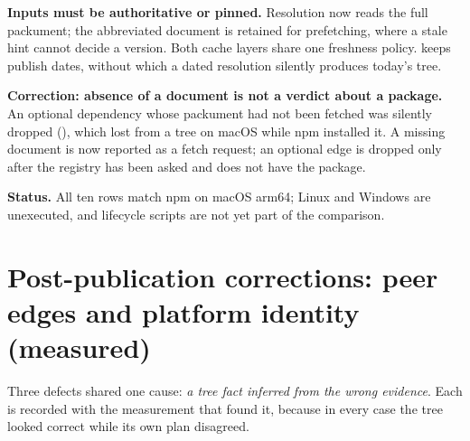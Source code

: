 \documentclass[
  11pt,
  letterpaper,
]{article}
\begin{document}
\textbf{Inputs must be authoritative or pinned.} Resolution now reads the full packument; the
abbreviated document is retained for prefetching, where a stale hint cannot decide a version. Both
cache layers share one freshness policy.  keeps publish dates, without which a dated
resolution silently produces today's tree.

\textbf{Correction: absence of a document is not a verdict about a package.} An optional
dependency whose packument had not been fetched was silently dropped (),
which lost  from a  tree on macOS while npm installed it. A missing document
is now reported as a fetch request; an optional edge is dropped only after the registry has been
asked and does not have the package.

\textbf{Status.} All ten rows match npm on macOS arm64; Linux and Windows are unexecuted, and
lifecycle scripts are not yet part of the comparison.


\section{Post-publication corrections: peer edges and platform identity (measured)}

Three defects shared one cause: \emph{a tree fact inferred from the wrong evidence}. Each is recorded
with the measurement that found it, because in every case the tree looked correct while its own plan
disagreed.
\end{document}
